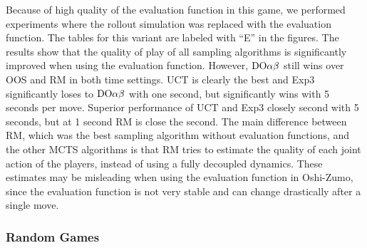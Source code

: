 Because of high quality of the evaluation function in this game, we performed experiments where the rollout simulation was replaced with the evaluation function. 
The tables for this variant are labeled with ``E'' in the figures. 
The results show that the quality of play of all sampling algorithms is significantly improved when using the evaluation function. 
However, $\textrm{DO}\alpha\beta$ still wins over OOS and RM in both time settings.
UCT is clearly the best and Exp3 significantly loses to $\textrm{DO}\alpha\beta$ with one second, but significantly wins with 5 seconds per move.
Superior performance of UCT and Exp3 closely second with 5 seconds, but at 1 second RM is close the second. 
The main difference between RM, which was the best sampling algorithm without evaluation functions, and the other MCTS algorithms is that RM tries to estimate the quality of each joint action of the players, instead of using a fully decoupled dynamics.
These estimates may be misleading when using the evaluation function in Oshi-Zumo, since the evaluation function is not very stable and can change drastically after a single move. 


\subsubsection{Random Games}

